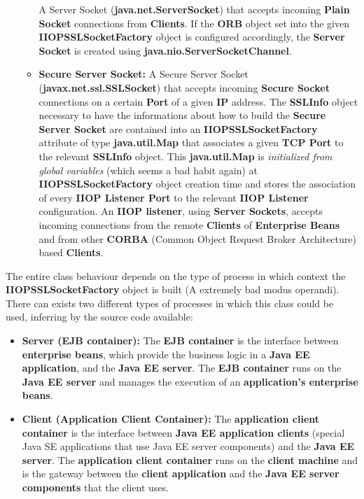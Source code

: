 \begin{itemize}
\begin{itemize}
				A Server Socket (\textbf{java.net.ServerSocket}) that accepts incoming \textbf{Plain Socket} connections from \textbf{Clients}. If the \textbf{ORB} object set into the given \textbf{IIOPSSLSocketFactory} object is configured accordingly, the \textbf{Server Socket} is created using \textbf{java.nio.ServerSocketChannel}.
			\item \textbf{Secure Server Socket:}
				A Secure Server Socket (\textbf{javax.net.ssl.SSLSocket}) that accepts incoming \textbf{Secure Socket} connections on a certain \textbf{Port} of a given \textbf{IP} address.
				The \textbf{SSLInfo} object necessary to have the informations about how to build the \textbf{Secure Server Socket} are contained into an \textbf{IIOPSSLSocketFactory} attribute of type \textbf{java.util.Map} that associates a given \textbf{TCP Port} to the relevant \textbf{SSLInfo} object.
				This \textbf{java.util.Map} is \textit{initialized from global variables} (which seems a bad habit again) at \textbf{IIOPSSLSocketFactory} object creation time and stores the association of every \textbf{IIOP Listener Port} to the relevant \textbf{IIOP Listener} configuration.
				An \textbf{IIOP listener}, using \textbf{Server Sockets}, accepts incoming connections from the remote \textbf{Clients} of \textbf{Enterprise Beans} and from other \textbf{CORBA} (Common Object Request Broker Architecture) based \textbf{Clients}.
		\end{itemize}
\end{itemize}
The entire class behaviour depends on the type of process in which context the \textbf{IIOPSSLSocketFactory} object is built (A extremely bad modus operandi).
There can exists two different types of processes in which this class could be used, inferring by the source code available:
\begin{itemize}
	\item \textbf{Server (EJB container):}
		The \textbf{EJB container} is the interface between \textbf{enterprise beans}, which provide the business logic in a \textbf{Java EE application}, and the \textbf{Java EE server}. The \textbf{EJB container} runs on the \textbf{Java EE server} and manages the execution of an \textbf{application's enterprise beans}.
	\item \textbf{Client (Application Client Container):}
		The \textbf{application client container} is the interface between \textbf{Java EE application clients} (special Java SE applications that use Java EE server components) and the \textbf{Java EE server}. The \textbf{application client container} runs on the \textbf{client machine} and is the gateway between the \textbf{client application} and the \textbf{Java EE server components} that the client uses.
\end{itemize}
